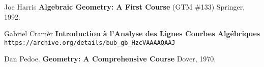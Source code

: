 \documentclass[12pt]{article}
\begin{document}
\begin{thebibliography}{}

\item Joe Harris \textbf{Algebraic Geometry: A First Course} (GTM \#133) Springer, 1992.

\item  Gabriel Cram\`{e}r \textbf{Introduction \`{a} l'Analyse des Lignes Courbes Algébriques} \\ \texttt{https://archive.org/details/bub\_{}gb\_{}HzcVAAAAQAAJ}

\item Dan Pedoe.  \textbf{Geometry: A Comprehensive Course} Dover, 1970.

\end{thebibliography}
\end{document}
